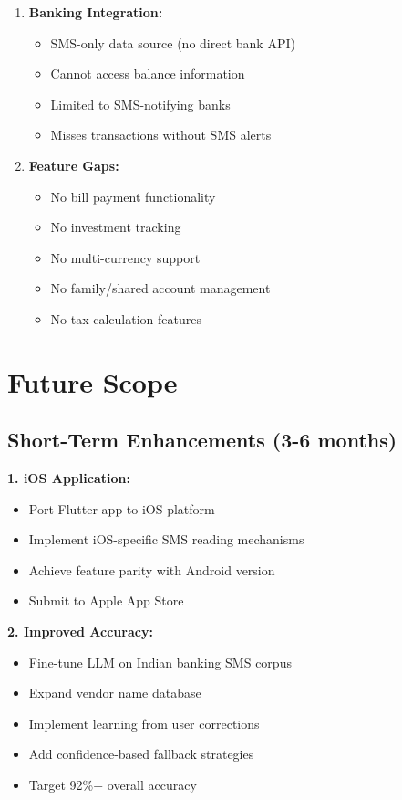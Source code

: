 \documentclass[11pt,a4paper]{report}
\begin{document}
\begin{itemize}
\begin{enumerate}
    \item \textbf{Banking Integration:}
    \begin{itemize}
        \item SMS-only data source (no direct bank API)
        \item Cannot access balance information
        \item Limited to SMS-notifying banks
        \item Misses transactions without SMS alerts
    \end{itemize}
    
    \item \textbf{Feature Gaps:}
    \begin{itemize}
        \item No bill payment functionality
        \item No investment tracking
        \item No multi-currency support
        \item No family/shared account management
        \item No tax calculation features
    \end{itemize}
\end{enumerate}

\section{Future Scope}

\subsection{Short-Term Enhancements (3-6 months)}

\textbf{1. iOS Application:}
\begin{itemize}
    \item Port Flutter app to iOS platform
    \item Implement iOS-specific SMS reading mechanisms
    \item Achieve feature parity with Android version
    \item Submit to Apple App Store
\end{itemize}

\textbf{2. Improved Accuracy:}
\begin{itemize}
    \item Fine-tune LLM on Indian banking SMS corpus
    \item Expand vendor name database
    \item Implement learning from user corrections
    \item Add confidence-based fallback strategies
    \item Target 92\%+ overall accuracy
\end{itemize}


\end{itemize}
\end{document}
